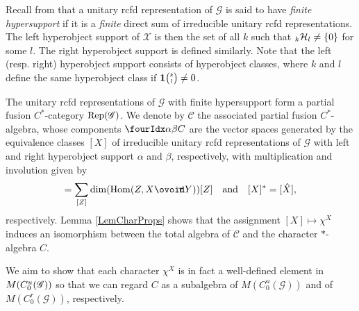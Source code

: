  Recall from \cite{DCT1} that a unitary rcfd representation of
 $\mathscr{G}$ is said to have \emph{finite hypersupport} if it is a
 \emph{finite} direct sum of irreducible unitary rcfd representations.
 The left hyperobject support of $\mathscr{X}$ is then the set of all
 $k$ such that ${}_{k}\mathcal{H}_{l}\neq \{0\}$ for some $l$. The right
 hyperobject support is defined similarly. Note that the left
 (resp. right) hyperobject support consists of hyperobject classes,
 where $k$ and $l$ define the same hyperobject class if
 $\mathbf{1}{\tiny {\begin{pmatrix} k\\l\end{pmatrix}}}\neq0$.

The unitary rcfd representations of $\mathscr{G}$ with finite
hypersupport form a partial
fusion  $C^{*}$-category $\mathrm{Rep}(\mathscr{G})$. We denote by
$\mathscr{C}$ the associated partial fusion $C^{*}$-algebra, whose
components $\Gru{C}{\alpha}{\beta}$ are the vector spaces generated by
the equivalence classes $[X]$ of irreducible unitary rcfd
representations of $\mathscr{G}$ with left and right hyperobject
support $\alpha$ and $\beta$, respectively, with multiplication and
involution given by 
\begin{align*}
  [X][Y] = \sum_{[Z]} \dim(\Hom(Z,X\Circt Y)) [Z] \quad \text{and} \quad [X]^{*} =[\hat{X}],
\end{align*}
respectively. Lemma \ref{LemCharProps} shows that the assignment $[X]
\mapsto \chi^{X}$ induces an isomorphism between the total algebra of
$\mathscr{C}$ and the character $*$-algebra $C$.


 We aim to show that each character $\chi^X$ is in fact a well-defined
 element in $M(C^{u}_{0}(\mathscr{G}))$ so that we can regard $C$ as a subalgebra of
 $M(C^{u}_{0}(\mathscr{G}))$ and of  $M(C^{r}_{0}(\mathscr{G}))$, respectively.

